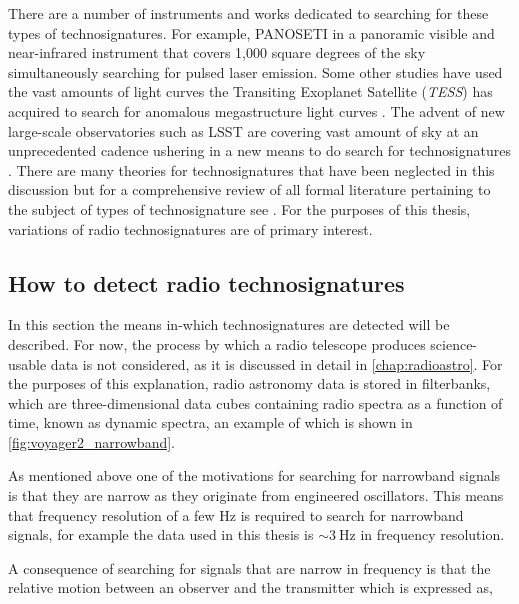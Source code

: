 There are a number of instruments and works dedicated to searching for these types of technosignatures. For example, PANOSETI \citep{maire_panoramic_2020, maire_panoramic_2022} in a panoramic visible and near-infrared instrument that covers 1,000 square degrees of the sky simultaneously searching for pulsed laser emission. Some other studies have used the vast amounts of light curves the Transiting Exoplanet Satellite (\textit{TESS}) has acquired to search for anomalous megastructure light curves \citep{cabrales_searching_2024}. The advent of new large-scale observatories such as LSST are covering vast amount of sky at an unprecedented cadence ushering in a new means to do search for technosignatures \citep{rogers_weird_2024}. There are many theories for technosignatures that have been neglected in this discussion but for a comprehensive review of all formal literature pertaining to the subject of types of technosignature see \cite{vidal_search_2026}. For the purposes of this thesis, variations of radio technosignatures are of primary interest. 


\subsection{How to detect radio technosignatures}

In this section the means in-which technosignatures are detected will be described. For now, the process by which a radio telescope produces science-usable data is not considered, as it is discussed in detail in \cref{chap:radioastro}. For the purposes of this explanation, radio astronomy data is stored in filterbanks, which are three-dimensional data cubes containing radio spectra as a function of time, known as dynamic spectra, an example of which is shown in \cref{fig:voyager2_narrowband}.

As mentioned above one of the motivations for searching for narrowband signals is that they are narrow as they originate from engineered oscillators. This means that frequency resolution of a few Hz is required to search for narrowband signals, for example the data used in this thesis is $\sim 3~\text{Hz}$ in frequency resolution. 

A consequence of searching for signals that are narrow in frequency is that the relative motion between an observer and the transmitter which is expressed as, 

